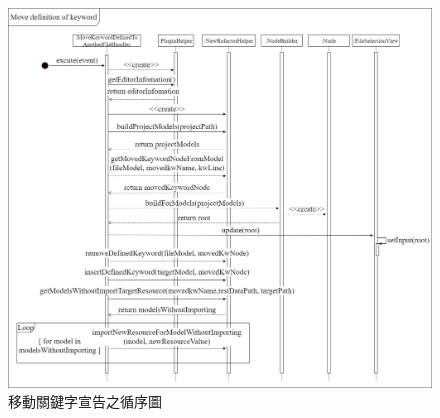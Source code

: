 \begin{figure}[H]
	\centering
    \includegraphics[width=1.0\textwidth]{picture/ch4/sequenceDiagram/Move_definition_of_keyword_in_eclipse_sequence_diagram.png}
    \caption{移動關鍵字宣告之循序圖}
    \label{f4.16}
\end{figure}